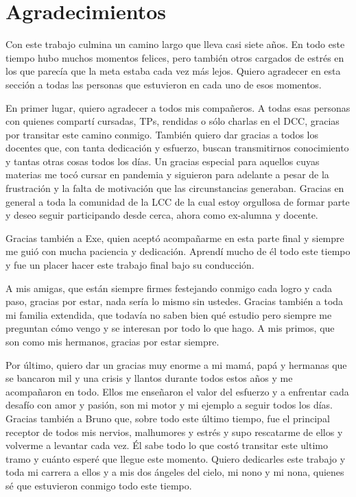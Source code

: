 \chapter*{Agradecimientos}

Con este trabajo culmina un camino largo que lleva casi siete años. En todo este tiempo hubo muchos momentos felices, pero también otros cargados de estrés en los que parecía que la meta estaba cada vez más lejos. Quiero agradecer en esta sección a todas las personas que estuvieron en cada uno de esos momentos. 

En primer lugar, quiero agradecer a todos mis compañeros. A todas esas personas con quienes compartí cursadas, TPs, rendidas o sólo charlas en el DCC, gracias por transitar este camino conmigo. También quiero dar gracias a todos los docentes que, con tanta dedicación y esfuerzo, buscan transmitirnos conocimiento y tantas otras cosas todos los días. Un gracias especial para aquellos cuyas materias me tocó cursar en pandemia y siguieron para adelante a pesar de la frustración y la falta de motivación que las circunstancias generaban. Gracias en general a toda la comunidad de la LCC de la cual estoy orgullosa de formar parte y deseo seguir participando desde cerca, ahora como ex-alumna y docente.

Gracias también a Exe, quien aceptó acompañarme en esta parte final y siempre me guió con mucha paciencia y dedicación. Aprendí mucho de él todo este tiempo y fue un placer hacer este trabajo final bajo su conducción.

A mis amigas, que están siempre firmes festejando conmigo cada logro y cada paso, gracias por estar, nada sería lo mismo sin ustedes. Gracias también a toda mi familia extendida, que todavía no saben bien qué estudio pero siempre me preguntan cómo vengo y se interesan por todo lo que hago. A mis primos, que son como mis hermanos, gracias por estar siempre. 

Por último, quiero dar un gracias muy enorme a mi mamá, papá y hermanas que se bancaron mil y una crisis y llantos durante todos estos años y me acompañaron en todo. Ellos me enseñaron el valor del esfuerzo y a enfrentar cada desafío con amor y pasión, son mi motor y mi ejemplo a seguir todos los días. Gracias también a Bruno que, sobre todo este último tiempo, fue el principal receptor de todos mis nervios, malhumores y estrés y supo rescatarme de ellos y volverme a levantar cada vez. Él sabe todo lo que costó transitar este ultimo tramo y cuánto esperé que llegue este momento. Quiero dedicarles este trabajo y toda mi carrera a ellos y a mis dos ángeles del cielo, mi nono y mi nona, quienes sé que estuvieron conmigo todo este tiempo.

 

 
